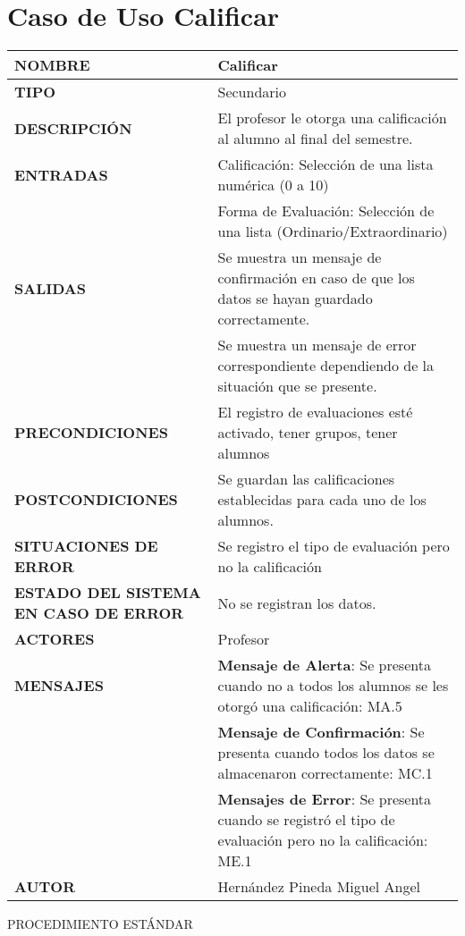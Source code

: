\newpage
\section{Caso de Uso Calificar}
\begin{longtable}{ | p{6cm} | p{10cm} |}
\hline
\textbf{NOMBRE} & Calificar\\
\hline
\textbf{TIPO} & Secundario\\
\hline
\textbf{DESCRIPCIÓN} & El profesor le otorga una calificación al alumno al final del semestre.\\
\hline
\textbf{ENTRADAS} & Calificación: Selección de una lista numérica (0 a 10)\\ & Forma de Evaluación: Selección de una lista (Ordinario/Extraordinario)\\
\hline
\textbf{SALIDAS} & Se muestra un mensaje de confirmación en caso de que los datos se hayan guardado correctamente.\\ & Se muestra un mensaje de error correspondiente dependiendo de la situación que se presente.\\
\hline
\textbf{PRECONDICIONES} & El registro de evaluaciones esté activado, tener grupos, tener alumnos\\
\hline
\textbf{POSTCONDICIONES} & Se guardan las calificaciones establecidas para cada uno de los alumnos.\\
\hline
\textbf{SITUACIONES DE ERROR} & Se registro el tipo de evaluación pero no la calificación\\
\hline
\textbf{ESTADO DEL SISTEMA EN CASO DE ERROR} & No se registran los datos.\\
\hline
\textbf{ACTORES} & Profesor\\
\hline
\textbf{MENSAJES} & \textbf{Mensaje de Alerta}: Se presenta cuando no a todos los alumnos se les otorgó una calificación: MA.5\\ & \textbf{Mensaje de Confirmación}: Se presenta cuando todos los datos se almacenaron correctamente: MC.1\\ & \textbf{Mensajes de Error}: Se presenta cuando se registró el tipo de evaluación pero no la calificación: ME.1\\
\hline
\textbf{AUTOR} & Hernández Pineda Miguel Angel\\
\hline
\end{longtable}
\vspace*{1cm}
\noindent
\Large{PROCEDIMIENTO ESTÁNDAR}
\large{}
